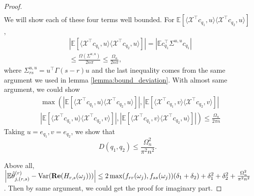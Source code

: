 \begin{proof}
\begin{equation}
\begin{aligned}
\end{aligned}
\end{equation}
We will show each of these four terms well bounded. For $\mathbb{E} \left[ \langle \mathcal{X}^\top  c_{q_1}, u \rangle  \langle \mathcal{X}^\top  c_{q_2}, u \rangle \right]$, 
\begin{equation}
\begin{aligned}
&|\mathbb{E} \left[ \langle \mathcal{X}^\top  c_{q_1}, u \rangle  \langle \mathcal{X}^\top  c_{q_2}, u \rangle\right]| = |\mathbb{E} c_{q_1}^\top   \Sigma^{u, u} c_{q_1}| \\
& \le \frac{\Omega(\Sigma^{u, u})}{2n\pi} \le \frac{\Omega_n}{2n\pi},
\end{aligned}
\end{equation}
where $\Sigma^{u, u}_{rs} = u^\top   \Gamma(s-r)u$ and the last inequality comes from the same argument we used in lemma \ref{lemma:bound_deviation}.
With almost same argument, we could show 
\begin{equation}
\begin{aligned}
&\max\left(\left|\mathbb{E} \left[ \langle \mathcal{X}^\top  c_{q_1}, u \rangle  \langle \mathcal{X}^\top  c_{q_2}, u \rangle \right]\right|,  \left|\mathbb{E} \left[ \langle \mathcal{X}^\top  c_{q_1}, v \rangle  \langle \mathcal{X}^\top  c_{q_2}, v \rangle \right]\right|\right.\\
&\left. \left|\mathbb{E} \left[ \langle \mathcal{X}^\top  c_{q_1}, u \rangle  \langle \mathcal{X}^\top  c_{q_2}, v \rangle \right]\right|, \left|\mathbb{E} \left[ \langle \mathcal{X}^\top  c_{q_1}, v \rangle  \langle \mathcal{X}^\top  c_{q_2}, u \rangle \right]\right|\right) \le \frac{\Omega_n}{2\pi n}
\end{aligned}
\end{equation}
Taking $u= e_{q_1}, v= e_{q_2}$, we show that 
\begin{equation}
D(q_1,q_2) \le \frac{\Omega_n^2}{\pi^2n^2}. 
\end{equation}

Above all, $\left |\mathbb{E} \hat{\theta}^{(r)}_{j,(r,s)}-\mbox{Var}({\bf Re}(H_{r,s}(\omega_j)))\right| \le 2\max(f_{rr}(\omega_j),f_{ss}(\omega_j))(\delta_1+\delta_2)+\delta_1^2+\delta_2^2+\frac{\Omega_n^2}{\pi^2n^2}$. Then by same argument, we could get the proof for imaginary part. 
\end{proof}

